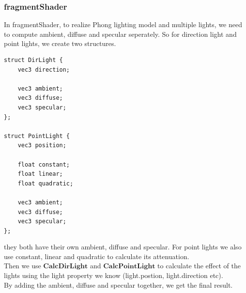 \documentclass[acmtog]{acmart}
\begin{document}
		\subsubsection{fragmentShader} 
		\quad In fragmentShader, to realize Phong lighting model and multiple lights,
		we need to compute ambient, diffuse and specular seperately. So for direction light and point lights,
		 we create two structures.
		\begin{lstlisting}
struct DirLight {
	vec3 direction;

	vec3 ambient;
	vec3 diffuse;
	vec3 specular;
};

struct PointLight {
	vec3 position;

	float constant;
	float linear;
	float quadratic;

	vec3 ambient;
	vec3 diffuse;
	vec3 specular;
};
		\end{lstlisting}
	\quad they both have their own ambient, diffuse and specular. For point lights
	we also use constant, linear and quadratic to calculate its attenuation.\\
	Then we use $\textbf{CalcDirLight}$
	and $\textbf{CalcPointLight}$
	to calculate the effect of the lights using the light property we know (light.postion, light.direction etc).
	\\By adding the ambient, diffuse and specular
	together, we get the final result.
\end{document}
